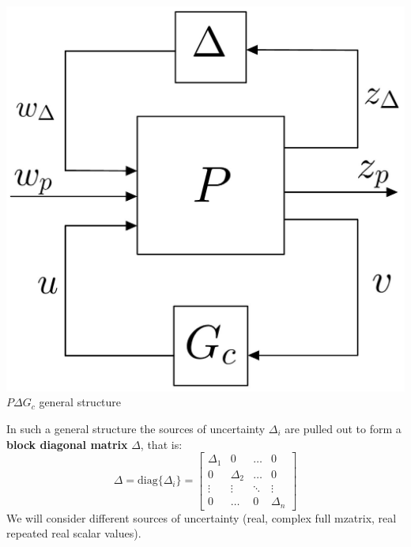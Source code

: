 \documentclass[a4paper, 12pt]{article}
\begin{document}
\begin{multicols}{2}
    \begin{center}
        \includegraphics[scale=0.14]{img/pdg.jpg}\\
        $P\Delta{G_c}$ \textsf{general structure}
    \end{center}
    

\noindent
In such a general structure the sources of uncertainty $\Delta_i$ are pulled out to form a \textbf{block diagonal matrix} $\Delta$, that is:
\begin{equation}\label{eq:Delta_blocks}
    \Delta=\text{diag}\{\Delta_i\}=\begin{bmatrix}
        \Delta_1&0&\dots&0\\
        0&\Delta_2&\dots&0\\
        \vdots&\vdots&\ddots&\vdots\\
        0&\dots&0&\Delta_n
    \end{bmatrix}
\end{equation}
We will consider different sources of uncertainty (real, complex full mzatrix, real repeated real scalar values).
\end{multicols}
\end{document}
